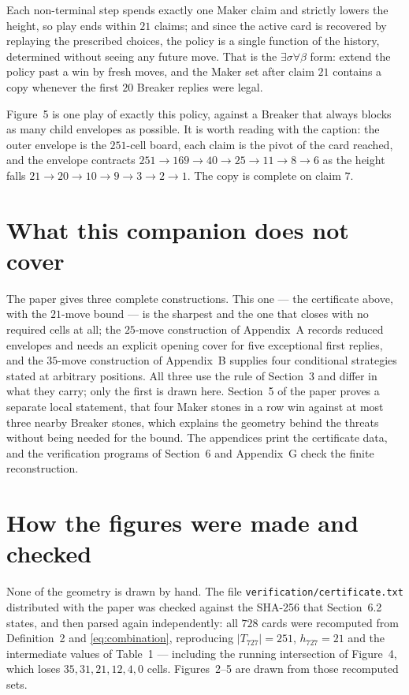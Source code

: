 \documentclass[11pt,a4paper]{article}
\begin{document}
Each non-terminal step spends exactly one Maker claim and strictly lowers the
height, so play ends within $21$ claims; and since the active card is recovered by
replaying the prescribed choices, the policy is a single function of the history,
determined without seeing any future move. That is the $\exists\sigma\forall\beta$
form: extend the policy past a win by fresh moves, and the Maker set after claim
$21$ contains a copy whenever the first $20$ Breaker replies were legal.



Figure~5 is one play of exactly this policy, against a Breaker that always blocks
as many child envelopes as possible. It is worth reading with the caption: the
outer envelope is the $251$-cell board, each claim is the pivot of the card
reached, and the envelope contracts $251\to169\to40\to25\to11\to8\to6$ as the
height falls $21\to20\to10\to9\to3\to2\to1$. The copy is complete on claim $7$.

\section{What this companion does not cover}

The paper gives three complete constructions. This one --- the certificate above,
with the $21$-move bound --- is the sharpest and the one that closes with no
required cells at all; the $25$-move construction of Appendix~A records reduced
envelopes and needs an explicit opening cover for five exceptional first replies,
and the $35$-move construction of Appendix~B supplies four conditional strategies
stated at arbitrary positions. All three use the rule of Section~3 and differ in
what they carry; only the first is drawn here. Section~5 of the paper proves a
separate local statement, that four Maker stones in a row win against at most
three nearby Breaker stones, which explains the geometry behind the threats
without being needed for the bound. The appendices print the certificate data, and
the verification programs of Section~6 and Appendix~G check the finite
reconstruction.

\section{How the figures were made and checked}

None of the geometry is drawn by hand. The file
\texttt{verification/certificate.txt} distributed with the paper was checked
against the SHA-256 that Section~6.2 states, and then parsed again independently:
all $728$ cards were recomputed from Definition~2 and \eqref{eq:combination},
reproducing $|T_{727}|=251$, $h_{727}=21$ and the intermediate values of Table~1
--- including the running intersection of Figure~4, which loses
$35,31,21,12,4,0$ cells. Figures~2--5 are drawn from those recomputed sets.
\end{document}
